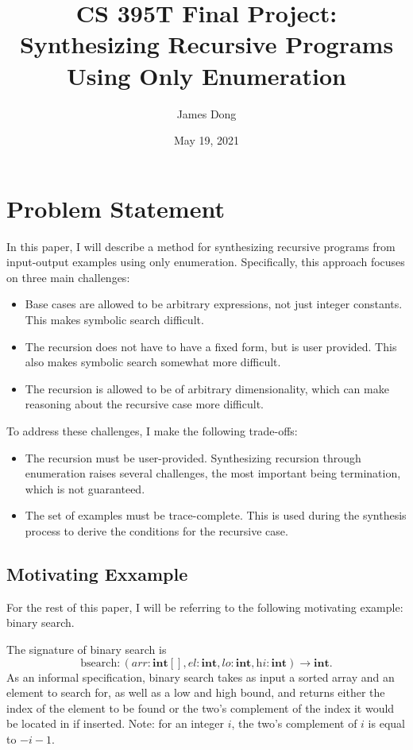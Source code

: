 \documentclass{article}
\newcommand*{\bsearch}{\textrm{bsearch}}
\newcommand*{\Aarr}{\textit{arr}}
\newcommand*{\Ael}{\textit{el}}
\newcommand*{\Alo}{\textit{lo}}
\newcommand*{\Ahi}{\textit{hi}}
\newcommand*{\Tint}{\textbf{int}}
\begin{document}
\title{CS 395T Final Project: Synthesizing Recursive Programs Using Only Enumeration}
\author{James Dong}
\date{May 19, 2021}

\maketitle

\section{Problem Statement}
In this paper, I will describe a method for synthesizing recursive
programs from input-output examples using only enumeration.
Specifically, this approach focuses on three main challenges:
\begin{itemize}
    \item Base cases are allowed to be arbitrary expressions, not
        just integer constants. This makes symbolic search difficult.
    \item The recursion does not have to have a fixed form,
        but is user provided. This also makes symbolic search somewhat
        more difficult.
    \item The recursion is allowed to be of arbitrary dimensionality,
        which can make reasoning about the recursive case more difficult.
\end{itemize}
To address these challenges, I make the following trade-offs:
\begin{itemize}
    \item The recursion must be user-provided. Synthesizing recursion
        through enumeration raises several challenges, the most important
        being termination, which is not guaranteed.
    \item The set of examples must be trace-complete. This is used during
        the synthesis process to derive the conditions for the recursive
        case.
\end{itemize}

\subsection{Motivating Exxample}
For the rest of this paper, I will be referring to the following
motivating example: binary search.

The signature of binary search is
\[ \bsearch : (\Aarr : \Tint[], \Ael : \Tint, \Alo : \Tint, \Ahi : \Tint) \to \Tint. \]
As an informal specification, binary search takes as input
a sorted array and an element to search for, as well as a low and high
bound, and returns either the index of the element to be found
or the two's complement of the index it would be located in if inserted.
Note: for an integer $i$, the two's complement of $i$ is equal to $-i - 1$.
\end{document}
